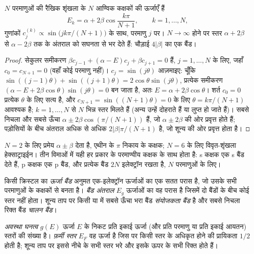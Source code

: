 \begin{theorem}[ह्युकेल शृंखला के स्तर]\label{thm:b3:solid-state:chain}
$N$ परमाणुओं की रैखिक शृंखला के $N$ आण्विक कक्षकों की ऊर्जाएँ हैं
\[
  E_k = \alpha + 2\beta\cos\frac{k\pi}{N + 1}, \qquad k = 1, \dots, N,
\]
गुणांकों $c_j^{(k)} \propto \sin\bigl(jk\pi/(N + 1)\bigr)$ के साथ, परमाणु $j$ पर। $N \to \infty$ होने पर स्तर
$\alpha + 2\beta$ से $\alpha - 2\beta$ तक के अंतराल को सघनता से भर देते हैं: चौड़ाई $4|\beta|$ का एक बैंड।
\end{theorem}

\begin{proof}
सेकुलर समीकरण $\beta c_{j-1} + (\alpha - E)c_j + \beta c_{j+1} = 0$ हैं, $j = 1, \dots, N$ के लिए, जहाँ $c_0 = c_{N+1} = 0$
(वहाँ कोई परमाणु नहीं)। $c_j = \sin(j\theta)$ आज़माइए: चूँकि $\sin((j - 1)\theta) + \sin((j + 1)\theta) = 2\cos\theta\sin(j\theta)$, प्रत्येक
समीकरण $(\alpha - E + 2\beta\cos\theta)\sin(j\theta) = 0$ बन जाता है, अतः $E = \alpha + 2\beta\cos\theta$। शर्त $c_0 = 0$
प्रत्येक $\theta$ के लिए सत्य है, और $c_{N+1} = \sin((N + 1)\theta) = 0$ के लिए $\theta = k\pi/(N + 1)$ आवश्यक है; $k = 1, \dots, N$ से $N$ भिन्न
स्तर मिलते हैं (अन्य उन्हें दोहराते हैं या लुप्त हो जाते हैं)। सबसे निचला और सबसे ऊँचा
$\alpha \pm 2\beta\cos(\pi/(N + 1))$ हैं, जो $\alpha \pm 2\beta$ की ओर प्रवृत्त होते हैं; पड़ोसियों के बीच अंतराल अधिक से अधिक
$2|\beta|\pi/(N + 1)$ है, जो शून्य की ओर प्रवृत्त होता है।
\end{proof}

$N = 2$ के लिए प्रमेय $\alpha \pm \beta$ देता है, एथीन के $\pi$ निकाय के कक्षक;
$N = 6$ के लिए विवृत-शृंखला हेक्साट्राइईन। तीन विमाओं में यही हर प्रकार के
परमाण्वीय कक्षक के साथ होता है: s कक्षक एक s बैंड देते हैं, p कक्षक एक p बैंड,
और प्रत्येक बैंड $2N$ इलेक्ट्रॉन रखता है, $N$ परमाणुओं के लिए।

\begin{definition}[बैंड]\label{def:b3:solid-state:band}
किसी क्रिस्टल का \emph{ऊर्जा बैंड} अनुमत एक-इलेक्ट्रॉन
ऊर्जाओं का एक सतत परास है, जो उसके सभी परमाणुओं के कक्षकों से बनता है।
\emph{बैंड अंतराल} $E_g$ ऊर्जाओं का वह परास है जिसमें दो
बैंडों के बीच कोई स्तर नहीं होता। शून्य ताप पर किसी  या  में सबसे ऊँचा
भरा बैंड \emph{संयोजकता बैंड} है और सबसे निचला रिक्त
बैंड \emph{चालन बैंड}।
\end{definition}

\begin{definition}\label{def:b3:solid-state:fermi}
\emph{अवस्था घनत्व} $g(E)$ ऊर्जा $E$ के निकट प्रति इकाई ऊर्जा
(और प्रति परमाणु या प्रति इकाई आयतन) स्तरों की संख्या है।
\emph{फ़र्मी स्तर} $E_F$ वह ऊर्जा है जिस पर किसी स्तर के अधिकृत होने की
प्रायिकता $1/2$ होती है; शून्य ताप पर इससे नीचे के सभी स्तर
भरे और इसके ऊपर के सभी रिक्त होते हैं।
\end{definition}


